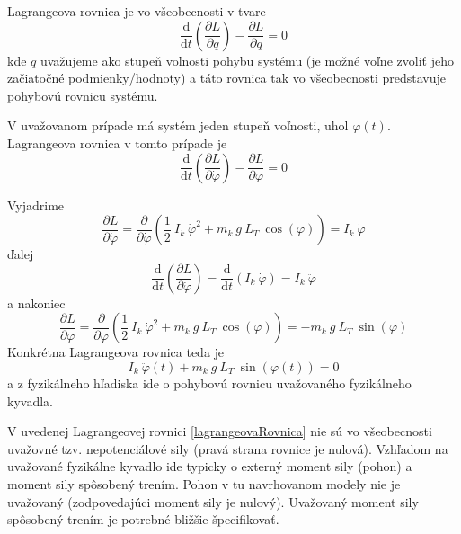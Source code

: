 \documentclass[a4paper, 10pt, ]{article}
\begin{document}
Lagrangeova rovnica je vo všeobecnosti v tvare
\begin{equation} \label{lagrangeovaRovnica}
    \frac{\text{d}}{\text{d}t} \left( \frac{\partial L}{\partial \dot{q}} \right) - \frac{\partial L}{\partial q} = 0
\end{equation}
kde $q$ uvažujeme ako stupeň voľnosti pohybu systému (je možné voľne zvoliť jeho začiatočné podmienky/hodnoty) a táto rovnica tak vo všeobecnosti predstavuje pohybovú rovnicu systému. 

V uvažovanom prípade má systém jeden stupeň voľnosti, uhol $\varphi(t)$. Lagrangeova rovnica v tomto prípade je
\begin{equation}
    \frac{\text{d}}{\text{d}t} \left( \frac{\partial L}{\partial \dot{\varphi}} \right) - \frac{\partial L}{\partial \varphi} = 0
\end{equation}

Vyjadrime
\begin{equation}
    \frac{\partial L}{\partial \dot{\varphi}} = \frac{\partial}{\partial \dot{\varphi}} \left( \frac{1}{2} \  I_k \  \dot\varphi^2 + m_k \  g \   L_T \  \cos(\varphi) \right) = I_k \  \dot\varphi
\end{equation}
ďalej
\begin{equation}
    \frac{\text{d}}{\text{d}t} \left( \frac{\partial L}{\partial \dot{\varphi}} \right) = \frac{\text{d}}{\text{d}t} \left( I_k \  \dot\varphi \right) = I_k \  \ddot\varphi
\end{equation}
a nakoniec
\begin{equation}
    \frac{\partial L}{\partial \varphi} = \frac{\partial}{\partial \varphi} \left( \frac{1}{2} \  I_k \  \dot\varphi^2 + m_k \  g \   L_T \  \cos(\varphi) \right) = - m_k \  g \   L_T \  \sin(\varphi)
\end{equation}
Konkrétna Lagrangeova rovnica teda je
\begin{equation} \label{pohybovaRovnicaKyvadla}
    I_k \  \ddot\varphi(t) + m_k \  g \   L_T \  \sin(\varphi(t)) = 0
\end{equation}
a z fyzikálneho hľadiska ide o pohybovú rovnicu uvažovaného fyzikálneho kyvadla.

V uvedenej Lagrangeovej rovnici \eqref{lagrangeovaRovnica} nie sú vo všeobecnosti uvažovné tzv. nepotenciálové sily (pravá strana rovnice je nulová). Vzhľadom na uvažované fyzikálne kyvadlo ide typicky o externý moment sily (pohon) a moment sily spôsobený trením. Pohon v tu navrhovanom modely nie je uvažovaný (zodpovedajúci moment sily je nulový). Uvažovaný moment sily spôsobený trením je potrebné bližšie špecifikovať.
\end{document}
